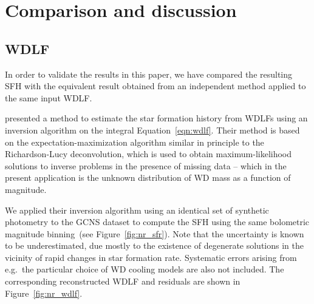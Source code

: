 \documentclass[fleqn,usenatbib]{mnras}
\begin{document}
\section{Comparison and discussion}
\label{sec:comparison}

\subsection{WDLF}
\label{sec:inversion}
In order to validate the results in this paper, we have compared the
resulting SFH with the equivalent result obtained from an
independent method applied to the same input WDLF.

\citet{2013MNRAS.434.1549R} presented a method to estimate the star formation
history from WDLFs using an inversion algorithm on the integral 
Equation~\ref{eqn:wdlf}. Their method is based on the expectation-maximization
algorithm similar in principle to the Richardson-Lucy deconvolution, which is
used to obtain maximum-likelihood solutions to inverse problems in the presence 
of missing data -- which in the present application is the unknown distribution
of WD mass as a function of magnitude.

We applied their inversion algorithm using an identical set of synthetic
photometry to the GCNS dataset to compute the SFH using the same bolometric
magnitude binning~(see Figure~\ref{fig:nr_sfr}). Note that the uncertainty is 
known to be underestimated, due mostly to the existence of degenerate solutions
in the vicinity of rapid changes in star formation rate. Systematic errors
arising from e.g.~the particular choice of WD cooling models are also not
included. The corresponding
reconstructed WDLF and residuals are shown in Figure~\ref{fig:nr_wdlf}.
\end{document}
